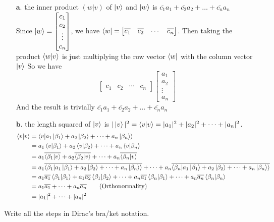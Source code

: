 \documentclass[11pt]{article}
\begin{document}
\begin{itemize}
    \item[$\textbf{a.}$] the inner product $(w|v)$ of $\ket{v}$ and $\ket{w}$ is
        $\overline{c_1}a_1 + \overline{c_2}a_2 + \dots + \overline{c_n}a_n$ \\
        Since $\ket{w} = \begin{bmatrix}c_1 \\ c_2 \\ \vdots \\ c_n \end{bmatrix}$,
            we have 
            $\bra{w} = \begin{bmatrix}\overline{c_1} & \overline{c_2} & \cdots & \overline{c_n} \end{bmatrix}$. 
            Then taking the product $\bra{w}\ket{v}$ is just multiplying the row vector $\bra{w}$ with the column vector $\ket{v}$
            So we have 
            $$\begin{bmatrix}\overline{c_1} & \overline{c_2} & \cdots & \overline{c_n} 
            \end{bmatrix}
            \begin{bmatrix}
                a_1 \\ a_2 \\ \vdots \\ a_n
            \end{bmatrix}$$
        And the result is trivially $\overline{c_1}a_1 + \overline{c_2}a_2 + \dots + \overline{c_n}a_n$

\item[$\textbf{b.}$] the length squared of $\ket{v}$ is
    $|\ket{v}|^2 = \bra{v}\ket{v} = |a_1|^2 + |a_2|^2 + \dots + |a_n|^2$.
    \begin{align*}
        \bra{v}\ket{v} &= \bra{v}\ket{ a_1\ket{\beta_1} + a_2\ket{\beta_2} + \dots + a_n\ket{\beta_n}} \\
        &= a_1\bra{v}\ket{\beta_1} + a_2\bra{v}\ket{\beta_2} + \dots + a_n\bra{v}\ket{\beta_n} \\
        &= a_1\overline{\bra{\beta_1}\ket{v}} + a_2\overline{\bra{\beta_2}\ket{v}} + \dots + a_n\overline{\bra{\beta_n}\ket{v}} \\
        &= a_1\overline{\bra{\beta_1}\ket{a_1\ket{\beta_1} + a_2\ket{\beta_2} + \dots + a_n\ket{\beta_n}}} + \dots + a_n\overline{\bra{\beta_n}\ket{
a_1\ket{\beta_1} + a_2\ket{\beta_2} + \dots + a_n\ket{\beta_n} }} \\
&= a_1\overline{a_1}\bra{\beta_1}\ket{\beta_1} + a_1\overline{a_2}\bra{\beta_1}\ket{\beta_2} + \dots + a_n\overline{a_1}\bra{\beta_n}\ket{\beta_1} + \dots + a_n\overline{a_n}\bra{\beta_n}\ket{\beta_n} \\
        &= a_1\overline{a_1} + \dots + a_n\overline{a_n} \ \ \ \ \ \   (\text{Orthonormality}) \\
        &= |a_1|^2 + \dots + |a_n|^2
    \end{align*}
\end{itemize}
Write all the steps in Dirac's bra/ket notation.
\end{document}
